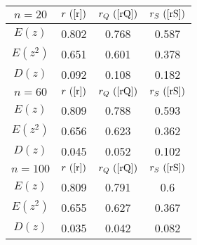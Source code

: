 \begin{tabular}{|c|c|c|c|}
\hline
$n = 20$ & $r ~(\ref{r})$ & $r_Q ~(\ref{rQ})$ & $r_S ~(\ref{rS})$\\
\hline
$E(z)$ & 0.802 & 0.768 & 0.587\\
\hline
$E(z^2)$ & 0.651 & 0.601 & 0.378\\
\hline
$D(z)$ & 0.092 & 0.108 & 0.182\\
\hline
$n = 60$ & $r ~(\ref{r})$ & $r_Q ~(\ref{rQ})$ & $r_S ~(\ref{rS})$\\
\hline
$E(z)$ & 0.809 & 0.788 & 0.593\\
\hline
$E(z^2)$ & 0.656 & 0.623 & 0.362\\
\hline
$D(z)$ & 0.045 & 0.052 & 0.102\\
\hline
$n = 100$ & $r ~(\ref{r})$ & $r_Q ~(\ref{rQ})$ & $r_S ~(\ref{rS})$\\
\hline
$E(z)$ & 0.809 & 0.791 & 0.6\\
\hline
$E(z^2)$ & 0.655 & 0.627 & 0.367\\
\hline
$D(z)$ & 0.035 & 0.042 & 0.082\\
\hline
\end{tabular}
